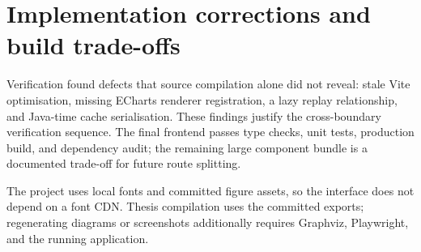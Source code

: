 \section{Implementation corrections and build trade-offs}
Verification found defects that source compilation alone did not reveal: stale Vite optimisation, missing ECharts renderer registration, a lazy replay relationship, and Java-time cache serialisation. These findings justify the cross-boundary verification sequence. The final frontend passes type checks, unit tests, production build, and dependency audit; the remaining large component bundle is a documented trade-off for future route splitting.

The project uses local fonts and committed figure assets, so the interface does not depend on a font CDN. Thesis compilation uses the committed exports; regenerating diagrams or screenshots additionally requires Graphviz, Playwright, and the running application.

